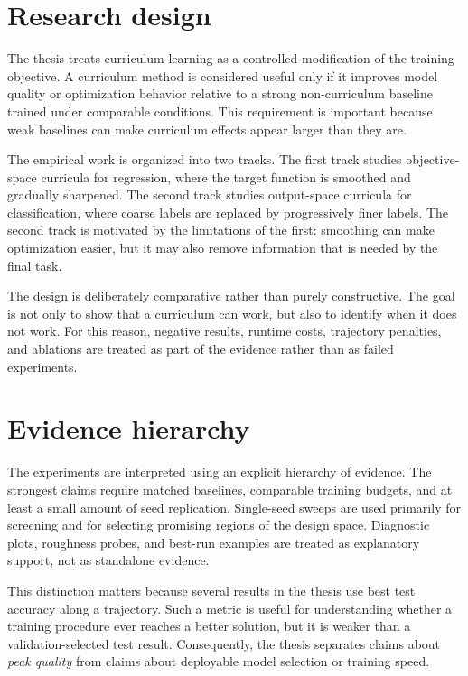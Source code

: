 \documentclass[english,master,a4paper,oneside]{ppfcmthesis}
\begin{document}
\section{Research design}

The thesis treats curriculum learning as a controlled modification of the
training objective. A curriculum method is considered useful only if it improves
model quality or optimization behavior relative to a strong non-curriculum
baseline trained under comparable conditions. This requirement is important
because weak baselines can make curriculum effects appear larger than they are.

The empirical work is organized into two tracks. The first track studies
objective-space curricula for regression, where the target function is smoothed
and gradually sharpened. The second track studies output-space curricula for
classification, where coarse labels are replaced by progressively finer labels.
The second track is motivated by the limitations of the first: smoothing can make
optimization easier, but it may also remove information that is needed by the
final task.

The design is deliberately comparative rather than purely constructive. The goal
is not only to show that a curriculum can work, but also to identify when it does
not work. For this reason, negative results, runtime costs, trajectory penalties,
and ablations are treated as part of the evidence rather than as failed
experiments.

\section{Evidence hierarchy}

The experiments are interpreted using an explicit hierarchy of evidence. The
strongest claims require matched baselines, comparable training budgets, and at
least a small amount of seed replication. Single-seed sweeps are used primarily
for screening and for selecting promising regions of the design space. Diagnostic
plots, roughness probes, and best-run examples are treated as explanatory
support, not as standalone evidence.

This distinction matters because several results in the thesis use best test
accuracy along a trajectory. Such a metric is useful for understanding whether a
training procedure ever reaches a better solution, but it is weaker than a
validation-selected test result. Consequently, the thesis separates claims about
\emph{peak quality} from claims about deployable model selection or training
speed.
\end{document}
